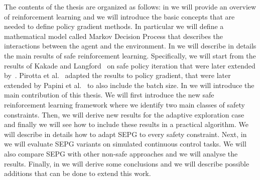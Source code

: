 The contents of the thesis are organized as follows: in  we will provide an overview of reinforcement learning and we will introduce the basic concepts that are needed to define policy gradient methods. In particular we will define a mathematical model called Markov Decision Process that describes the interactions between the agent and the environment. In  we will describe in details the main results of safe reinforcement learning. Specifically, we will start from the results of Kakade and Langford~\cite{Kakade02approximatelyoptimal} on safe policy iteration that were later extended by~\cite{safe_iteration}. Pirotta et al.~\cite{adaptive_step} adapted the results to policy gradient, that were later extended by Papini et al.~\cite{adaptive_batch} to also include the batch size. In  we will introduce the main contribution of this thesis. We will first introduce the new safe reinforcement learning framework where we identify two main classes of safety  constraints. Then, we will derive new results for the adaptive exploration case and finally we will see how to include these results in a practical algorithm. We will describe in details how to adapt SEPG to every safety constraint. Next, in  we will evaluate SEPG variants on simulated continuous control tasks. We will also compare SEPG with other non-safe approaches and we will analyse the results. Finally, in  we will derive some conclusions and we will describe possible additions that can be done to extend this work.
 



%

